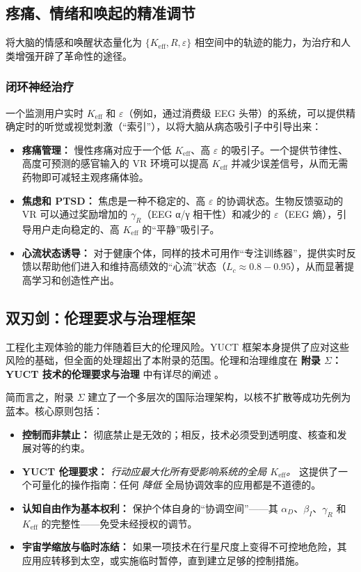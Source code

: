 \documentclass[12pt,a4paper]{article}
\begin{document}
	\subsection{疼痛、情绪和唤起的精准调节}
	
	将大脑的情感和唤醒状态量化为 \(\{K_{\mathrm{eff}}, R, \varepsilon\}\) 相空间中的轨迹的能力，为治疗和人类增强开辟了革命性的途径。
	
	\subsubsection{闭环神经治疗}
	一个监测用户实时 \(K_{\mathrm{eff}}\) 和 \(\varepsilon\)（例如，通过消费级 EEG 头带）的系统，可以提供精确定时的听觉或视觉刺激（“索引”），以将大脑从病态吸引子中引导出来：
	\begin{itemize}
		\item \textbf{疼痛管理：} 慢性疼痛对应于一个低 \(K_{\mathrm{eff}}\)、高 \(\varepsilon\) 的吸引子。一个提供节律性、高度可预测的感官输入的 VR 环境可以提高 \(K_{\mathrm{eff}}\) 并减少误差信号，从而无需药物即可减轻主观疼痛体验。
		\item \textbf{焦虑和 PTSD：} 焦虑是一种不稳定的、高 \(\varepsilon\) 的协调状态。生物反馈驱动的 VR 可以通过奖励增加的 \(\gamma_R\)（EEG α/γ 相干性）和减少的 \(\varepsilon\)（EEG 熵），引导用户走向稳定的、高 \(K_{\mathrm{eff}}\) 的“平静”吸引子。
		\item \textbf{心流状态诱导：} 对于健康个体，同样的技术可用作“专注训练器”，提供实时反馈以帮助他们进入和维持高绩效的“心流”状态（\(L_c \approx 0.8-0.95\)），从而显著提高学习和创造性产出。
	\end{itemize}
	
	\subsection{双刃剑：伦理要求与治理框架}
	
	工程化主观体验的能力伴随着巨大的伦理风险。YUCT 框架本身提供了应对这些风险的基础，但全面的处理超出了本附录的范围。伦理和治理维度在 \textbf{附录 \(\Sigma\)：YUCT 技术的伦理要求与治理} 中有详尽的阐述 \cite{AppendixSigma}。
	
	简而言之，附录 \(\Sigma\) 建立了一个多层次的国际治理架构，以核不扩散等成功先例为蓝本。核心原则包括：
	\begin{itemize}
		\item \textbf{控制而非禁止：} 彻底禁止是无效的；相反，技术必须受到透明度、核查和发展对等的约束。
		\item \textbf{YUCT 伦理要求：} \textit{行动应最大化所有受影响系统的全局 \(K_{\mathrm{eff}}\)。} 这提供了一个可量化的操作指南：任何 \textit{降低} 全局协调效率的应用都是不道德的。
		\item \textbf{认知自由作为基本权利：} 保护个体自身的“协调空间”——其 \(\alpha_D\)、\(\beta_I\)、\(\gamma_R\) 和 \(K_{\mathrm{eff}}\) 的完整性——免受未经授权的调节。
		\item \textbf{宇宙学缩放与临时冻结：} 如果一项技术在行星尺度上变得不可控地危险，其应用应转移到太空，或实施临时暂停，直到建立足够的控制措施。
	\end{itemize}
	
\end{document}

